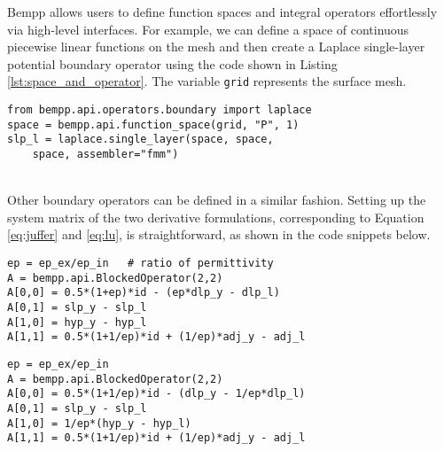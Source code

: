Bempp allows users to define function spaces and integral operators effortlessly via high-level interfaces.
For example, we can define a space of continuous piecewise linear functions on the mesh and then create a Laplace single-layer potential boundary operator using the code shown in Listing \ref{lst:space_and_operator}.
The variable \texttt{grid} represents the surface mesh.
\begin{adjustbox}{max width=\linewidth}
    \begin{lstlisting}[caption=Define function spaces and boundary operators in Bempp.,
        label={lst:space_and_operator}]
from bempp.api.operators.boundary import laplace
space = bempp.api.function_space(grid, "P", 1)
slp_l = laplace.single_layer(space, space,
    space, assembler="fmm")
    \end{lstlisting}
\end{adjustbox} \\

\noindent
Other boundary operators can be defined in a similar fashion.
Setting up the system matrix of the two derivative formulations, corresponding to Equation \ref{eq:juffer} and \ref{eq:lu}, is straightforward, as shown in the code snippets below.

\begin{adjustbox}{max width=\linewidth}
    \begin{lstlisting}[caption=Interior formulation.,
        label={lst:interior_formulation},
        emph={id, slp_l, slp_y, dlp_l, dlp_y,
        hyp_l, hyp_y, adj_l, adj_y},
        emphstyle=\color{textblue}
        ]
ep = ep_ex/ep_in   # ratio of permittivity
A = bempp.api.BlockedOperator(2,2)
A[0,0] = 0.5*(1+ep)*id - (ep*dlp_y - dlp_l)
A[0,1] = slp_y - slp_l
A[1,0] = hyp_y - hyp_l
A[1,1] = 0.5*(1+1/ep)*id + (1/ep)*adj_y - adj_l
    \end{lstlisting}
\end{adjustbox}

\begin{adjustbox}{max width=\linewidth}
    \begin{lstlisting}[caption=Exterior formulation.,
        label={lst:exterior_formulation},
        emph={id, slp_l, slp_y, dlp_l, dlp_y,
        hyp_l, hyp_y, adj_l, adj_y},
        emphstyle=\color{textblue}
        ]
ep = ep_ex/ep_in
A = bempp.api.BlockedOperator(2,2)
A[0,0] = 0.5*(1+1/ep)*id - (dlp_y - 1/ep*dlp_l)
A[0,1] = slp_y - slp_l
A[1,0] = 1/ep*(hyp_y - hyp_l)
A[1,1] = 0.5*(1+1/ep)*id + (1/ep)*adj_y - adj_l
    \end{lstlisting}
\end{adjustbox} \\


